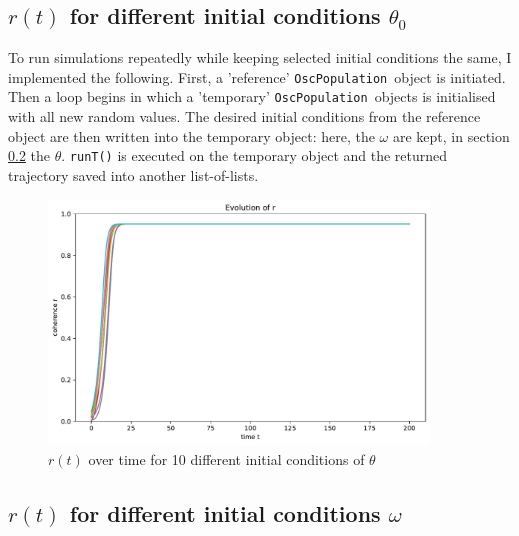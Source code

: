 \documentclass[11pt,a4paper]{article}
\newcommand{\oscpop}{\texttt{OscPopulation}~}
\newcommand{\code}[1]{\texttt{#1}}
\begin{document}
\subsection{$r(t)$ for different initial conditions $\theta_0$}

To run simulations repeatedly while keeping selected initial conditions the same, I implemented the following. 
First, a 'reference' \oscpop object is initiated. 
Then a loop begins in which a 'temporary' \oscpop objects is initialised with all new random values. 
The desired initial conditions from the reference object are then written into the temporary object: here, the $\omega$ are kept, in section \ref{keepthetas} the $\theta$. 
\code{runT()} is executed on the temporary object and the returned trajectory saved into another list-of-lists. 



\begin{figure}[H]
	\centering
	\includegraphics[width=0.9\textwidth]{graphics/4_t-vs-r_fixedOmegas_omegaDistr=uniform_N=2000_1611570486.pdf}
	\caption{$r(t)$ over time for 10 different initial conditions of $\theta$}
	\label{4}
\end{figure}






\subsection{$r(t)$ for different initial conditions $\omega$}\label{keepthetas}
\end{document}
